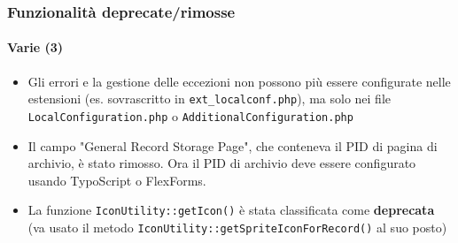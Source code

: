 \begin{frame}[fragile]
	\frametitle{Funzionalità deprecate/rimosse}
	\framesubtitle{Varie (3)}

	\begin{itemize}

		\item Gli errori e la gestione delle eccezioni non possono più essere configurate nelle estensioni (es. sovrascritto in
			\texttt{ext\_localconf.php}), ma solo nei file \texttt{LocalConfiguration.php} o
			\texttt{AdditionalConfiguration.php} 

		\item Il campo "General Record Storage Page", che conteneva il PID di pagina di archivio, è stato rimosso.
			Ora il PID di archivio deve essere configurato usando TypoScript o FlexForms.

		\item La funzione \texttt{IconUtility::getIcon()} è stata classificata come \textbf{deprecata} (va
			usato il metodo \texttt{IconUtility::getSpriteIconForRecord()} al suo posto)

	\end{itemize}

\end{frame}

